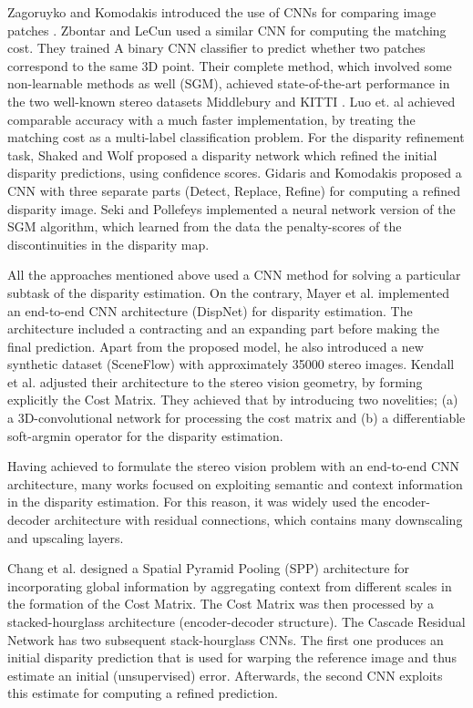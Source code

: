 \documentclass[runningheads]{llncs}
\begin{document}
Zagoruyko and Komodakis introduced the use of CNNs for comparing image patches \cite{zagoruyko2015learning}. Zbontar and LeCun \cite{Zbontar_2015_CVPR} used a similar CNN for computing the matching cost. They trained A binary CNN classifier to predict whether two patches correspond to the same 3D point. Their complete method, which involved some non-learnable methods as well (SGM), achieved state-of-the-art performance in the two well-known stereo datasets Middlebury \cite{Scharstein2014} and KITTI \cite{Menze2015ISA}. Luo et. al \cite{luo2016efficient} achieved comparable accuracy with a much faster implementation, by treating the matching cost as a multi-label classification problem. For the disparity refinement task, Shaked and Wolf \cite{shaked2017improved} proposed a disparity network which refined the initial disparity predictions, using confidence scores. Gidaris and Komodakis \cite{Gidaris2017DetectLabeling} proposed a CNN with three separate parts (Detect, Replace, Refine) for computing a refined disparity image. Seki and Pollefeys implemented a neural network version of the SGM algorithm, which learned from the data the penalty-scores of the discontinuities in the disparity map. 

All the approaches mentioned above used a CNN method for solving a particular subtask of the disparity estimation. On the contrary, Mayer et al. \cite{Mayer2016ALD} implemented an end-to-end CNN architecture (DispNet) for disparity estimation. The architecture included a contracting and an expanding part before making the final prediction. Apart from the proposed model, he also introduced a new synthetic dataset (SceneFlow) with approximately 35000 stereo images. Kendall et al. \cite{Kendall2017End-to-EndRegression} adjusted their architecture to the stereo vision geometry, by forming explicitly the Cost Matrix. They achieved that by introducing two novelities; (a) a 3D-convolutional network for processing the cost matrix and (b) a differentiable soft-argmin operator for the disparity estimation. 

Having achieved to formulate the stereo vision problem with an end-to-end CNN architecture, many works focused on exploiting semantic and context information in the disparity estimation. For this reason, it was widely used the encoder-decoder architecture with residual connections, which contains many downscaling and upscaling layers.

Chang et al. \cite{Chang2018PyramidNetwork} designed a Spatial Pyramid Pooling (SPP) architecture for incorporating global information by aggregating context from different scales in the formation of the Cost Matrix. The Cost Matrix was then processed by a stacked-hourglass architecture (encoder-decoder structure). The Cascade Residual Network \cite{Pang2018CascadeMatching} has two subsequent stack-hourglass CNNs. The first one produces an initial disparity prediction that is used for warping the reference image and thus estimate an initial (unsupervised) error. Afterwards, the second CNN exploits this estimate for computing a refined prediction.  
\end{document}
